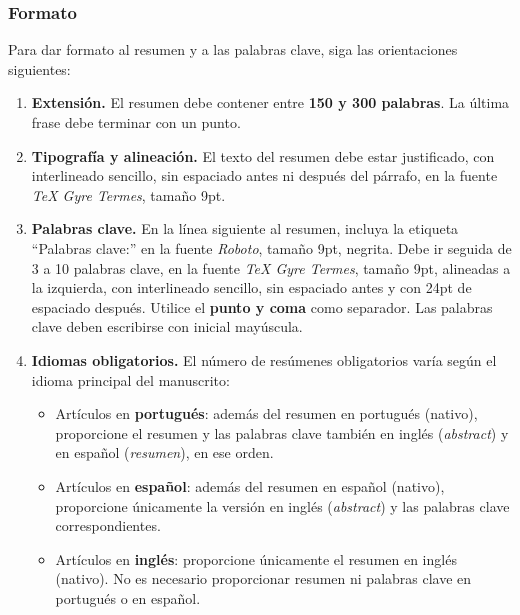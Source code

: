 \documentclass[spanish]{rbie2026}%
\begin{document}
\subsubsection{Formato}

Para dar formato al resumen y a las palabras clave, siga las orientaciones siguientes:

\begin{enumerate}
  \item \textbf{Extensión.} El resumen debe contener entre \textbf{150 y 300 palabras}. La última frase debe terminar con un punto.

  \item \textbf{Tipografía y alineación.} El texto del resumen debe estar justificado, con interlineado sencillo, sin espaciado antes ni después del párrafo, en la fuente \textit{TeX Gyre Termes}, tamaño 9pt.

  \item \textbf{Palabras clave.} En la línea siguiente al resumen, incluya la etiqueta ``Palabras clave:'' en la fuente \textit{Roboto}, tamaño 9pt, negrita. Debe ir seguida de 3 a 10 palabras clave, en la fuente \textit{TeX Gyre Termes}, tamaño 9pt, alineadas a la izquierda, con interlineado sencillo, sin espaciado antes y con 24pt de espaciado después. Utilice el \textbf{punto y coma} como separador. Las palabras clave deben escribirse con inicial mayúscula.

  \item \textbf{Idiomas obligatorios.} El número de resúmenes obligatorios varía según el idioma principal del manuscrito:

  \begin{itemize}
    \item Artículos en \textbf{portugués}: además del resumen en portugués (nativo), proporcione el resumen y las palabras clave también en inglés (\textit{abstract}) y en español (\textit{resumen}), en ese orden.

    \item Artículos en \textbf{español}: además del resumen en español (nativo), proporcione únicamente la versión en inglés (\textit{abstract}) y las palabras clave correspondientes.

    \item Artículos en \textbf{inglés}: proporcione únicamente el resumen en inglés (nativo). No es necesario proporcionar resumen ni palabras clave en portugués o en español.
  \end{itemize}
\end{enumerate}
\end{document}
